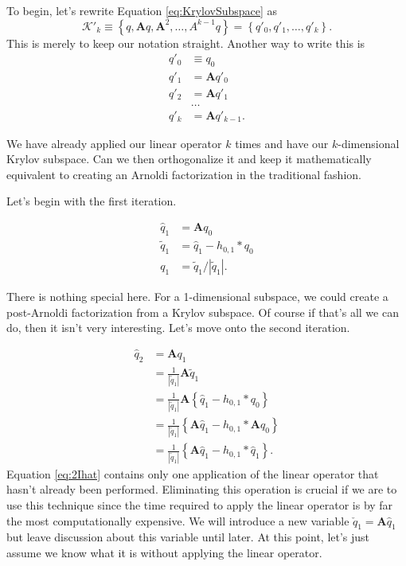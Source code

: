 \documentclass[12pt]{article}
\newcommand{\A}{\mathbf{A}}
\newcommand{\qp}[1]{q'_{#1}}
\newcommand{\qh}[1]{\hat{q}_{#1}}
\newcommand{\qt}[1]{\tilde{q}_{#1}}
\newcommand{\qc}[1]{\check{q}_{#1}}
\newcommand{\Aq}[1]{\A q_{#1}}
\newcommand{\Ah}[1]{\A \qh{#1}}
\newcommand{\At}[1]{\A \qt{#1}}
\begin{document}
To begin, let's rewrite Equation \ref{eq:KrylovSubspace} as
\begin{equation}
    \mathcal{K}'_k \equiv \left\{q, \A q, \A^2, \ldots, A^{k-1}q\right\} = \left\{\qp{0}, \qp{1}, \ldots, \qp{k}\right\}.
\end{equation}
This is merely to keep our notation straight.  Another way to write this is
\begin{subequations}\begin{align}
    \qp{0} &\equiv q_0 \\
    \qp{1} &= \A \qp{0} \\
    \qp{2} &= \A \qp{1} \\
    &\ldots \\
    \qp{k} &= \A \qp{k-1}.
    \label{}
\end{align}\end{subequations}

We have already applied our linear operator $k$ times and have our $k$-dimensional Krylov subspace.  Can we then orthogonalize it and keep it mathematically equivalent to creating an Arnoldi factorization in the traditional fashion.

Let's begin with the first iteration.

\begin{align}
    \qh{1} &= \Aq{0} \\
    \qt{1} &= \qh{1} - h_{0,1}*q_0 \\
    q_1 &= \qt{1}/\left|\qt{1}\right|.
\end{align}

There is nothing special here.  For a 1-dimensional subspace, we could create a post-Arnoldi factorization from a Krylov subspace.  Of course if that's all we can do, then it isn't very interesting.  Let's move onto the second iteration.

\begin{subequations}
    \begin{align}
    \qh{2} &= \A q_1 \\
    &= \frac{1}{\left|\qt{1}\right|}\At{1} \\
    &= \frac{1}{\left|\qt{1}\right|}\A \left\{\qh{1}-h_{0,1}*q_0\right\} \\
    &= \frac{1}{\left|\qt{1}\right|} \left\{\Ah{1}-h_{0,1}*\Aq{0}\right\} \\
    &= \frac{1}{\left|\qt{1}\right|} \left\{\Ah{1}-h_{0,1}*\qh{1}\right\} \label{eq:2Ihat}.
    \end{align}
\end{subequations}
Equation \ref{eq:2Ihat} contains only one application of the linear operator that hasn't already been performed.  Eliminating this operation is crucial if we are to use this technique since the time required to apply the linear operator is by far the most computationally expensive.  We will introduce a new variable $\qc{1} = \Ah{1}$ but leave discussion about this variable until later.  At this point, let's just assume we know what it is without applying the linear operator.
\end{document}
